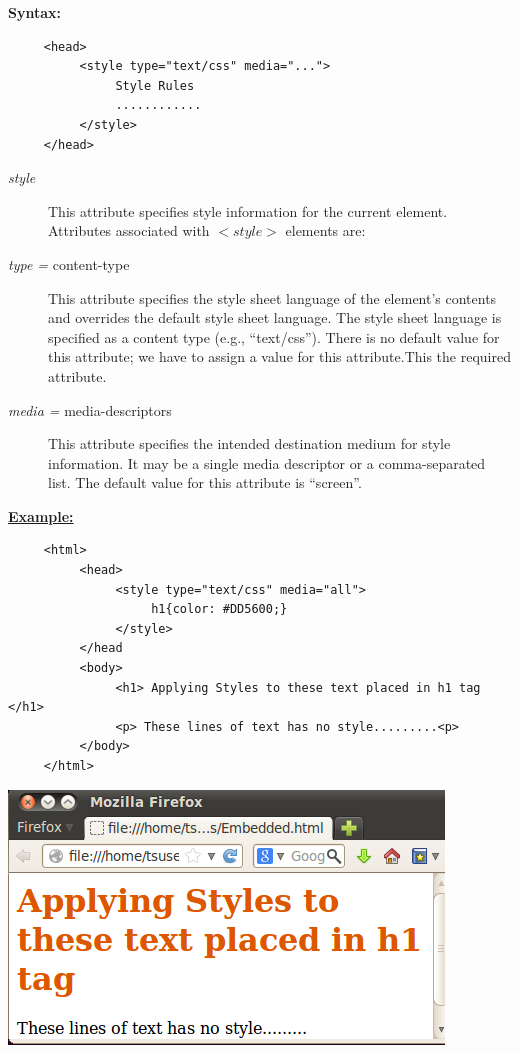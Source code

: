 \documentclass[11pt,a4paper]{article}
\begin{document}
\textbf{Syntax:}
\begin{verbatim}
     <head>
          <style type="text/css" media="...">
               Style Rules
               ............
          </style>
     </head>
\end{verbatim}
\begin{description}
\item[\emph{style}] This attribute specifies style information for the current element.
Attributes associated with $<style>$ elements are:
\item[\emph{type =} content-type]  This attribute specifies the style sheet language of the element's contents and overrides the default style sheet language. The style sheet language is specified as a content type (e.g., ``text/css''). There is no default value for this attribute; we have to assign a value for this attribute.This the required attribute.
\item[\emph{media =} media-descriptors]  This attribute specifies the intended destination medium for style information. It may be a single media descriptor or a comma-separated list. The default value for this attribute is ``screen''.
\end{description}
\underline{\textbf{Example:}}
\begin{verbatim}
     <html>
          <head>
               <style type="text/css" media="all">
                    h1{color: #DD5600;}
               </style>
          </head
          <body>
               <h1> Applying Styles to these text placed in h1 tag </h1>
               <p> These lines of text has no style.........<p>
          </body>
     </html>
\end{verbatim}
\begin{center}
\includegraphics[scale=0.6]{Embedded}\\
\end{center}
\end{document}
